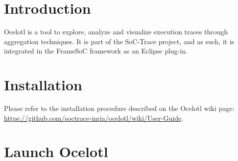 \documentclass[twoside]{article}
\begin{document}
\begin{sloppypar} %


\newcommand{\parag}[1]{\paragraph{#1}\mbox{}\\}
\newcommand{\subparag}[1]{\subparagraph{#1}\mbox{}\\}
\newcommand{\subsubparag}[1]{\subparagraph{#1}}
\renewcommand{\labelitemi}{$\bullet$}
\renewcommand{\labelitemii}{$\circ$}

\makeRT 

\renewcommand{\contentsname}{Table of contents}
\tableofcontents
\newpage
\section{Introduction}
\label{intro}


Ocelotl is a tool to explore, analyze and visualize execution traces through aggregation techniques. It is part of the SoC-Trace project, and as such, it is integrated in the FrameSoC framework as an Eclipse plug-in. 

\section{Installation}
Please refer to the installation procedure described on the Ocelotl wiki page: \url{https://github.com/soctrace-inria/ocelotl/wiki/User-Guide}.


\section{Launch Ocelotl}


\end{sloppypar}
\end{document}
